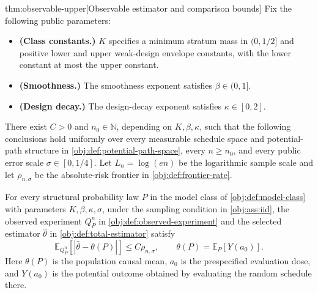 \begin{theoremv}{thm:observable-upper}[Observable estimator and comparison bounds]
Fix the following public parameters:
\begin{itemize}
\item \textbf{(Class constants.)} \(K\) specifies a minimum stratum mass in \((0,1/2]\) and positive lower and upper weak-design envelope constants, with the lower constant at most the upper constant.
\item \textbf{(Smoothness.)} The smoothness exponent satisfies \(\beta\in(0,1]\).
\item \textbf{(Design decay.)} The design-decay exponent satisfies \(\kappa\in[0,2]\).
\end{itemize}
There exist \(C>0\) and \(n_0\in\mathbb N\), depending on \(K,\beta,\kappa\), such that the following conclusions hold uniformly over every measurable schedule space and potential-path structure in \cref{obj:def:potential-path-space}, every \(n\ge n_0\), and every public error scale \(\sigma\in[0,1/4]\). Let \(L_n=\log(en)\) be the logarithmic sample scale and let \(\rho_{n,\sigma}\) be the absolute-risk frontier in \cref{obj:def:frontier-rate}.

For every structural probability law \(P\) in the model class of \cref{obj:def:model-class} with parameters \(K,\beta,\kappa,\sigma\), under the sampling condition in \cref{obj:ass:iid}, the observed experiment \(Q_P^n\) in \cref{obj:def:observed-experiment} and the selected estimator \(\widehat\theta\) in \cref{obj:def:total-estimator} satisfy
\[
\mathbb E_{Q_P^n}\!\left[
  \left|\widehat\theta-\theta(P)\right|
\right]
\le C\rho_{n,\sigma},
\qquad
\theta(P)=\mathbb E_P[Y(a_0)].
\]
Here \(\theta(P)\) is the population causal mean, \(a_0\) is the prespecified evaluation dose, and \(Y(a_0)\) is the potential outcome obtained by evaluating the random schedule there.


\end{theoremv}
